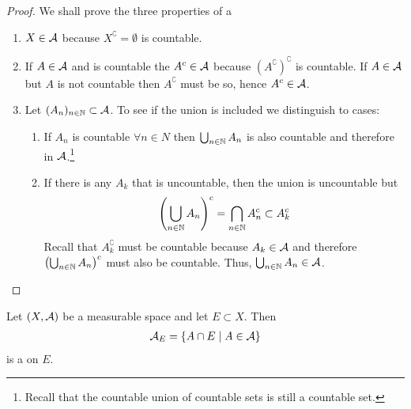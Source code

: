 \begin{proof} We shall prove the three properties of a \siga
	\begin{enumerate}
		\item $X \in \mathcal{A}$ because $X^\complement = \emptyset$ is countable.
		\item If $A \in \mathcal{A}$ and is countable the $A^c \in \mathcal{A}$ because $(A^\complement)^\complement$ is countable. If $A \in \mathcal{A}$ but $A$ is not countable then $A^\complement$ must be so, hence $A^c \in \mathcal{A}$.
		\item Let $(A_n)_{n \in \mathbb{N}} \subset \mathcal{A}$. To see if the union is included we distinguish to cases:
		\begin{enumerate}
			\item If $A_n$ is countable $\forall n \in N$ then $\bigcup_{n \in \mathbb{N}} A_n$ is also countable and therefore in $\mathcal{A}$.\footnote{Recall that the countable union of countable sets is still a countable set.}
			\item If there is any $A_k$ that is uncountable, then the union is uncountable but
			\begin{align*}
			\left(\bigcup_{n \in \mathbb{N}} A_n\right)^c = \bigcap_{n \in \mathbb{N}} A_n^c \subset A_k^c
			\end{align*}
			Recall that $A_k^\complement$ must be countable because $A_k \in \mathcal{A}$ and therefore $\left(\bigcup_{n \in \mathbb{N}} A_n\right)^c$ must also be countable. Thus, $\bigcup_{n \in \mathbb{N}} A_n \in \mathcal{A}$.
		\end{enumerate}
	\end{enumerate}
\end{proof}

\begin{eg}
	\label{eg:trace-siga}
	Let $(X, \mathcal{A})$ be a measurable space and let $E \subset X$. Then
	\begin{align}
		\mathcal{A}_E = \{A \cap E \mid A \in \mathcal{A}\}
	\end{align}
	is a \siga on $E$.
\end{eg}

